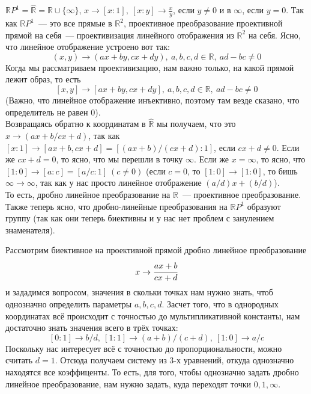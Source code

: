 \documentclass[11pt]{article}
\begin{document}
    \begin{example}
        $ \mathbb{R}P^1 = \widehat{\mathbb{R}} = \mathbb{R} \cup \{ \infty \}$, $x \to [x : 1], \ [x : y] \to \frac{x}{y}$, если $y \neq 0$ и в $\infty$, если $y = 0$.
        Так как $\mathbb{R}P^1$~--- это все прямые в $\mathbb{R}^2$, проективное преобразование проективной прямой на себя~--- проективизация линейного отображения из $\mathbb{R}^2$ на себя. Ясно, что линейное отображение устроено вот так:
        \[ (x,  y) \to (ax + by , cx + dy), \ a, b, c, d \in \mathbb{R}, \ ad - bc \neq 0 \]
        Когда мы рассматриваем проективизацию, нам важно только, на какой прямой лежит образ, то есть
        \[ [x,  y] \to [ax + by , cx + dy], \ a, b, c, d \in \mathbb{R}, \ ad - bc \neq 0 \]
        (Важно, что линейное отображение инъективно, поэтому там везде сказано, что определитель не равен 0).\\
        Возвращаясь обратно к координатам в $\widehat{\mathbb{R}}$ мы получаем, что это $x \to (ax + b / cx + d)$, так как $[x : 1] \to [ax + b, cx + d] = [(ax + b) / (cx + d) : 1]$, если $cx + d \neq 0$. Если же $cx + d = 0$, то ясно, что мы перешли в точку $\infty$. Если же $x = \infty$, то ясно, что $[1 : 0] \to [a : c] = [a / c : 1] \ (c \neq 0)$ (если $c = 0$, то $[1 : 0] \to [1 : 0]$, то бишь $\infty \to \infty$, так как у нас просто линейное отображение $(a /d)x + (b / d)$).\\
        То есть, дробно линейное преобразование на $\mathbb{R}$~--- проективное преобразование. Также теперь ясно, что дробно-линейные преобразования на $\mathbb{R}P^1$ образуют группу (так как они теперь биективны и у нас нет проблем с занулением знаменателя).
    \end{example}

    \begin{example}
    Рассмотрим  биективное на проективной прямой дробно линейное преобразование
        \[ x \to \cfrac{ax + b}{cx + d}\]
        и зададимся вопросом, значения в скольки точках нам нужно знать, чтоб однозначно определить параметры $a, b, c, d$. Засчет того, что в однородных координатах всё происходит с точностью до мультипликативной константы, нам достаточно знать значения всего в трёх точках:
        \[ [0 : 1] \to b / d, \ [1 : 1] \to (a + b) / (c + d), \ [1 : 0] \to a / c\]
        Поскольку нас интересует всё с точностью до пропорциональности, можно считать $d = 1$. Отсюда получаем систему из 3-х уравнений, откуда однозначно находятся все коэффиценты. То есть, для того, чтобы однозначно задать дробно линейное преобразование, нам нужно задать, куда переходят точки $0, 1, \infty$.
    \end{example}
\end{document}
